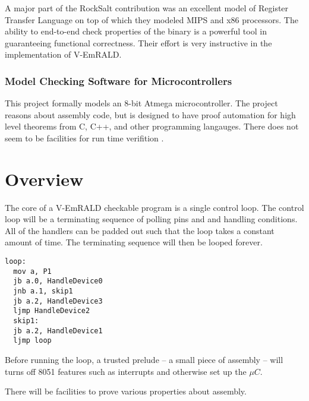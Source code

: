 \documentclass[preprint,11pt]{sigplanconf}
\begin{document}
A major part of the RockSalt contribution was an excellent model of
Register Transfer Language on top of which they modeled MIPS and x86
processors. The ability to end-to-end check properties of the binary
is a powerful tool in guaranteeing functional correctness. Their
effort is very instructive in the implementation of V-EmRALD.
\subsubsection{Model Checking Software for Microcontrollers}
This project formally models an 8-bit Atmega microcontroller.
The project reasons about assembly code, but is designed to have proof
automation for high level theorems from C, C++, and other programming langauges.
There does not seem to be facilities for run time verifition \cite{mcsm}.

\section{Overview}

The core of a V-EmRALD checkable program is a single control loop. The
control loop will be a terminating sequence of 
polling pins and and handling conditions. All of the handlers can be
padded out such that the loop takes a constant amount of time. The
terminating sequence will then be looped forever.
\begin{lstlisting}[caption={The control loop here first polls port 1, then checks pin 0 and jumps to the appropriate handler.
      Some more complicated logic is also shown which will handle
      device 3 if both pin 1 or 2 are high, device 2 if pin 1 is high
      and pin 2 is low, and device 1 if pin 2 is high and pin 1 is
      low.},
  label={lst:ControlLoop}]
  loop:
  mov a, P1     
  jb a.0, HandleDevice0
  jnb a.1, skip1
  jb a.2, HandleDevice3
  ljmp HandleDevice2
  skip1:
  jb a.2, HandleDevice1
  ljmp loop
\end{lstlisting}

Before running the loop, a trusted prelude -- a small piece of
assembly -- will turns off 8051 features such as interrupts and
otherwise set up the $\mu C$.

There will be facilities to prove various properties about assembly.
\end{document}
